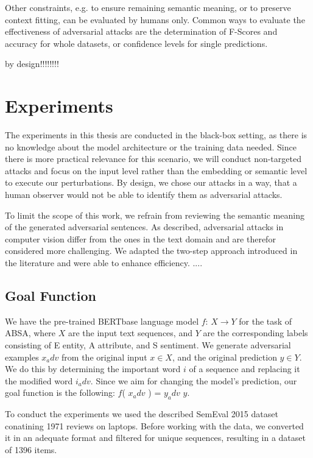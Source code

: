 Other constraints, e.g. to ensure remaining semantic meaning, or to preserve context fitting, can be evaluated by humans only. 
Common ways to evaluate the effectiveness of adversarial attacks are the determination of F-Scores and accuracy for whole datasets, or confidence levels for single predictions. 

by design!!!!!!!!


\section{Experiments}
\label{sec:experiments}

The experiments in this thesis are conducted in the black-box setting, as there is no knowledge about the model architecture or the training data needed. Since there is more practical relevance for this scenario, we will conduct non-targeted attacks and focus on the input level rather than the embedding or semantic level to execute our perturbations. 
By design, we chose our attacks in a way, that a human observer would not be able to identify them as adversarial attacks. 

To limit the scope of this work, we refrain from reviewing the semantic meaning of the generated adversarial sentences.
As described, adversarial attacks in computer vision differ from the ones in the text domain and are therefor considered more challenging. We adapted the two-step approach introduced in the literature and were able to enhance efficiency. 
....

\subsection{Goal Function}
 \label{sec:goal_function_m}
We have the pre-trained BERTbase language model $f$: ${X \rightarrow Y}$ for the task of ABSA, where $X$ are the input text sequences, and $Y$ are the corresponding labels consisting of E entity, A attribute, and S sentiment. We generate adversarial examples ${x_adv}$ from the original input $x \in X$, and the original prediction $y \in Y$. We do this by determining the important word $i$ of a sequence and replacing it the modified word $i_adv$. Since we aim for changing the model's prediction, our goal function is the following: 
$f$( $x_adv$ ) = $y_adv$ \neq $y$.


To conduct the experiments we used the described SemEval 2015 dataset conatining 1971 reviews on laptops. Before working with the data, we converted it in an adequate format and filtered for unique sequences, resulting in a dataset of 1396 items. 

